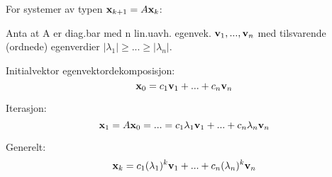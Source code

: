 For systemer av typen $\mathbf{x}_{k+1} = A\mathbf{x}_k$:

Anta at A er diag.bar med n lin.uavh. egenvek. $\mathbf{v}_1, ..., \mathbf{v}_n$
med tilsvarende (ordnede) egenverdier $|\lambda_1| \geq ... \geq |\lambda_n|$.

Initialvektor egenvektordekomposisjon:
$$\mathbf{x}_0 = c_1\mathbf{v}_1 + ... + c_n\mathbf{v}_n$$

Iterasjon:
$$\mathbf{x}_1 = A\mathbf{x}_0
  = ...
  = c_1\lambda_1\mathbf{v}_1 + ... + c_n\lambda_n\mathbf{v}_n$$

Generelt:
$$\mathbf{x}_k = c_1(\lambda_1)^k\mathbf{v}_1 + ... + c_n(\lambda_n)^k\mathbf{v}_n$$
